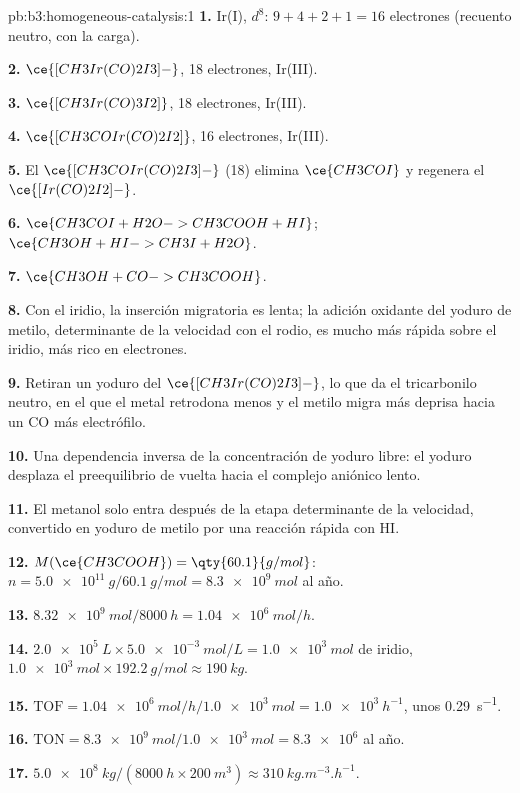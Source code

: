 \begin{solution}{pb:b3:homogeneous-catalysis:1}
\textbf{1.} Ir(I), $d^8$: $9 + 4 + 2 + 1 = 16$ electrones (recuento neutro, con la carga).

\textbf{2.} $\ce{[CH3Ir(CO)2I3]-}$, 18 electrones, Ir(III).

\textbf{3.} $\ce{[CH3Ir(CO)3I2]}$, 18 electrones, Ir(III).

\textbf{4.} $\ce{[CH3COIr(CO)2I2]}$, 16 electrones, Ir(III).

\textbf{5.} El $\ce{[CH3COIr(CO)2I3]-}$ (18) elimina $\ce{CH3COI}$ y regenera el $\ce{[Ir(CO)2I2]-}$.

\textbf{6.} $\ce{CH3COI + H2O -> CH3COOH + HI}$; $\ce{CH3OH + HI -> CH3I + H2O}$.

\textbf{7.} $\ce{CH3OH + CO -> CH3COOH}$.

\textbf{8.} Con el iridio, la inserción migratoria es lenta; la adición oxidante del
yoduro de metilo, determinante de la velocidad con el rodio, es mucho más rápida sobre el iridio, más
rico en electrones.

\textbf{9.} Retiran un yoduro del $\ce{[CH3Ir(CO)2I3]-}$, lo que da el tricarbonilo neutro, en el que
el metal retrodona menos y el metilo migra más deprisa hacia un CO más
electrófilo.

\textbf{10.} Una dependencia inversa de la concentración de yoduro libre: el yoduro desplaza
el preequilibrio de vuelta hacia el complejo aniónico lento.

\textbf{11.} El metanol solo entra después de la etapa determinante de la velocidad, convertido en
yoduro de metilo por una reacción rápida con HI.

\textbf{12.} $M(\ce{CH3COOH}) = \qty{60.1}{g/mol}$: $n = \qty{5.0e11}{g}/\qty{60.1}{g/mol} = \qty{8.3e9}{mol}$ al año.

\textbf{13.} $\qty{8.32e9}{mol}/\qty{8000}{h} = \qty{1.04e6}{mol/h}$.

\textbf{14.} $\qty{2.0e5}{L} \times \qty{5.0e-3}{mol/L} = \qty{1.0e3}{mol}$ de iridio, $\qty{1.0e3}{mol} \times \qty{192.2}{g/mol} \approx \qty{190}{kg}$.

\textbf{15.} $\mathrm{TOF} = \qty{1.04e6}{mol/h}/\qty{1.0e3}{mol} = \qty{1.0e3}{h^{-1}}$, unos \qty{0.29}{s^{-1}}.

\textbf{16.} $\mathrm{TON} = \qty{8.3e9}{mol}/\qty{1.0e3}{mol} = \num{8.3e6}$ al año.

\textbf{17.} $\qty{5.0e8}{kg}/(\qty{8000}{h} \times \qty{200}{m^3}) \approx \qty{310}{kg.m^{-3}.h^{-1}}$.


\end{solution}
